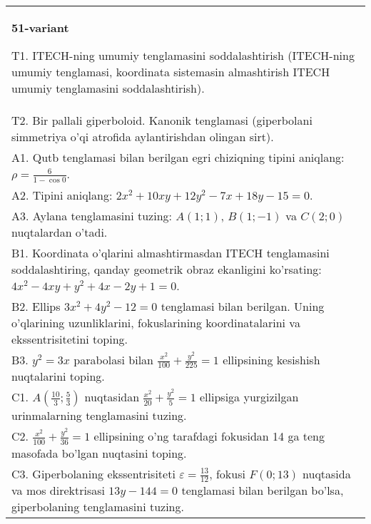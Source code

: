 \documentclass{article}
\begin{document}
\begin{tabular}{m{17cm}}
\textbf{51-variant}
\newline

T1. ITECH-ning umumiy tenglamasini soddalashtirish (ITECH-ning umumiy tenglamasi, koordinata sistemasin almashtirish ITECH umumiy tenglamasini soddalashtirish).\\

T2. Bir pallali giperboloid. Kanonik tenglamasi (giperbolani simmetriya o'qi atrofida aylantirishdan olingan sirt).\\

A1. Qutb tenglamasi bilan berilgan egri chiziqning tipini aniqlang: $\rho=\frac{6}{1-\cos 0}$.\\

A2. Tipini aniqlang: $2x^{2}+10xy+12y^{2}-7x+18y-15=0$.\\

A3. Aylana tenglamasini tuzing: $A(1;1)$, $B(1;-1)$ va $C(2;0)$ nuqtalardan o'tadi.\\

B1. Koordinata o'qlarini almashtirmasdan ITECH tenglamasini soddalashtiring, qanday geometrik obraz ekanligini ko'rsating: $4x^{2} - 4xy + y^{2} + 4x - 2y + 1 = 0$.  \\

B2. Ellips $3x^{2} + 4y^{2} - 12 = 0$ tenglamasi bilan berilgan. Uning o'qlarining uzunliklarini, fokuslarining koordinatalarini va ekssentrisitetini toping.  \\

B3. $y^{2} = 3x$ parabolasi bilan $\frac{x^{2}}{100} + \frac{y^{2}}{225} = 1$ ellipsining kesishish nuqtalarini toping.  \\

C1. $A(\frac{10}{3};\frac{5}{3})$ nuqtasidan $\frac{x^{2}}{20} + \frac{y^{2}}{5} = 1$ ellipsiga yurgizilgan urinmalarning tenglamasini tuzing.  \\

C2. $\frac{x^{2}}{100} + \frac{y^{2}}{36} = 1$ ellipsining o'ng tarafdagi fokusidan 14 ga teng masofada bo'lgan nuqtasini toping.  \\

C3. Giperbolaning ekssentrisiteti $\varepsilon = \frac{13}{12}$, fokusi $F(0;13)$ nuqtasida va mos direktrisasi $13y - 144 = 0$ tenglamasi bilan berilgan bo'lsa, giperbolaning tenglamasini tuzing.  \\

\end{tabular}
\vspace{1cm}
\end{document}
